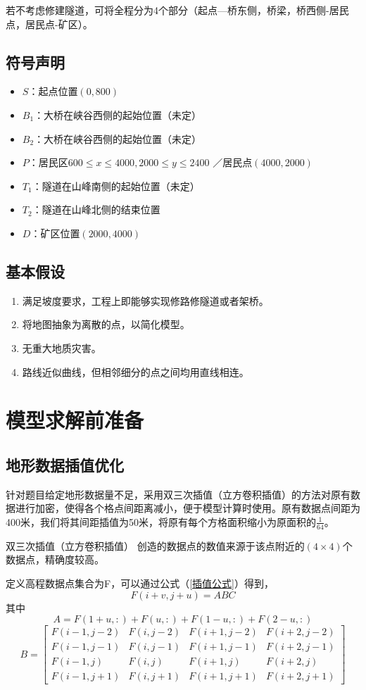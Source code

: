 \documentclass[bwprint]{cumcmthesis}
\begin{document}
若不考虑修建隧道，可将全程分为4个部分（起点—桥东侧，桥梁，桥西侧-居民点，居民点-矿区）。

\subsection{符号声明}
\begin{itemize}
	\item $S$：起点位置$(0,800)$
	\item $B_1$：大桥在峡谷西侧的起始位置（未定）
	\item $B_2$：大桥在峡谷西侧的起始位置（未定）
	\item $P$：居民区$600 \leqslant x \leqslant 4000, 2000 \leqslant y \leqslant 2400$ ／居民点$(4000,2000)$
	\item $T_1$：隧道在山峰南侧的起始位置（未定）
	\item $T_2$：隧道在山峰北侧的结束位置
	\item $D$：矿区位置$(2000,4000)$
\end{itemize}

\subsection{基本假设}
\begin{enumerate}
	\item 满足坡度要求，工程上即能够实现修路修隧道或者架桥。
	\item 将地图抽象为离散的点，以简化模型。
	\item 无重大地质灾害。
	\item 路线近似曲线，但相邻细分的点之间均用直线相连。
\end{enumerate}


\section{模型求解前准备}
\subsection{地形数据插值优化}
针对题目给定地形数据量不足，采用双三次插值（立方卷积插值）的方法对原有数据进行加密，使得各个格点间距离减小，便于模型计算时使用。原有数据点间距为400米，我们将其间距插值为50米，将原有每个方格面积缩小为原面积的$\frac{1}{64}$。

双三次插值（立方卷积插值） 创造的数据点的数值来源于该点附近的$(4\times4)$个数据点，精确度较高。

定义高程数据点集合为F，可以通过公式（\ref{插值公式}）得到，
\begin{equation}
	F(i+v,j+u) = ABC
	\label{插值公式}
\end{equation}
其中
$$ A = F(1+u,:)+F(u,:)+F(1-u,:)+F(2-u,:)$$
$$ B = \left[
\begin{matrix}
F(i-1,j-2)&F(i,j-2)&F(i+1,j-2)&F(i+2,j-2)\\
F(i-1,j-1)&F(i,j-1)&F(i+1,j-1)&F(i+2,j-1)\\
F(i-1,j)&F(i,j)&F(i+1,j)&F(i+2,j)\\
F(i-1,j+1)&F(i,j+1)&F(i+1,j+1)&F(i+2,j+1)
\end{matrix}
\right]
$$
\end{document}
